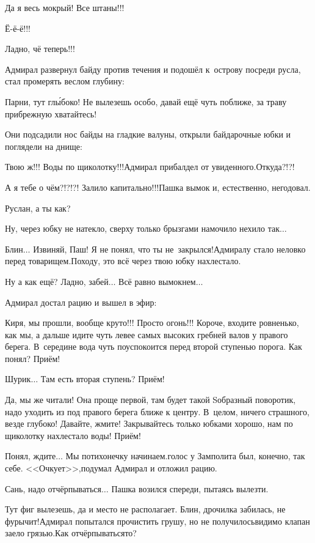 \diagdash Да я весь мокрый! Все штаны!!!

\diagdash Ё-ё-ё!!!

\diagdash Ладно, чё теперь!!!

Адмирал развернул байду против течения и подошёл к~острову посреди русла, стал промерять веслом глубину:

\diagdash Парни, тут гл{\'ы}боко! Не вылезешь особо, давай ещё чуть поближе, за траву прибрежную хватайтесь!

Они подсадили нос байды на гладкие валуны, открыли байдарочные юбки и поглядели на днище:

\diagdash Твою ж!!! Воды по щиколотку!!!\mdash Адмирал прибалдел от увиденного.\mdash Откуда?!?!

\diagdash А я тебе о чём?!?!?! Залило капитально!!!\mdash Пашка вымок и, естественно, негодовал.
 
\diagdash Руслан, а ты как?

\diagdash Ну, через юбку не натекло, сверху только брызгами намочило нехило так$\ldots$

\diagdash Блин$\ldots$ Извиняй, Паш! Я не понял, что ты не~закрылся!\mdash Адмиралу стало неловко перед товарищем.\mdash Походу, это всё через твою юбку нахлестало.

\diagdash Ну а как ещё? Ладно, забей$\ldots$ Всё равно вымокнем$\ldots$

Адмирал достал рацию и вышел в эфир:

\diagdash Киря, мы прошли, вообще круто!!! Просто огонь!!! Короче, входите ровненько, как мы, а дальше идите чуть левее самых высоких гребней валов у правого берега. В~середине вода чуть поуспокоится перед второй ступенью порога. Как понял? Приём!

\diagdash Шурик$\ldots$ Там есть вторая ступень? Приём!

\diagdash Да, мы же читали! Она проще первой, там будет такой S\sdash образный поворотик, надо уходить из под правого берега ближе к центру. В~целом, ничего страшного, везде глубоко! Давайте, жмите! Закрывайтесь только юбками хорошо, нам по щиколотку нахлестало воды! Приём!

\diagdash Понял, ждите$\ldots$ Мы потихонечку начинаем.\mdash голос у Замполита был, конечно, так себе. <<Очкует>>,\mdash подумал Адмирал и отложил рацию.

\diagdash Сань, надо отчёрпываться$\ldots$ \mdash Пашка возился спереди, пытаясь вылезти.

\diagdash Тут фиг вылезешь, да и место не располагает. Блин, дрочилка забилась, не фурычит!\mdash Адмирал попытался прочистить грушу, но не получилось\mdash видимо клапан заело грязью.\mdash Как отчёрпываться\sdash то?

